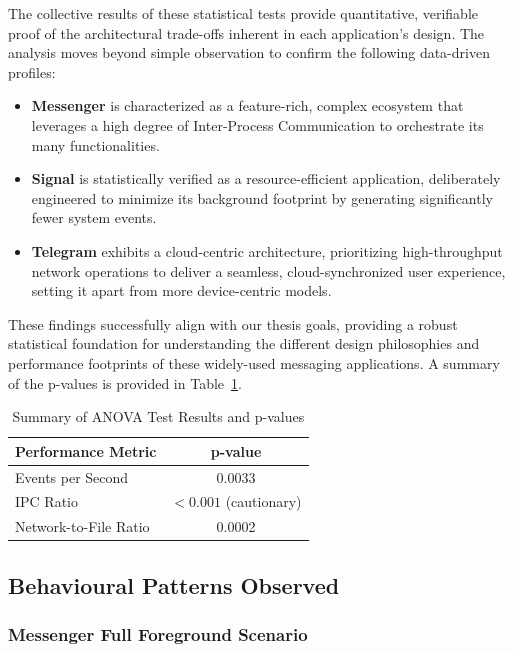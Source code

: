 \documentclass[a4paper,12pt]{report}
\begin{document}
The collective results of these statistical tests provide quantitative, verifiable proof of the architectural trade-offs inherent in each application's design. The analysis moves beyond simple observation to confirm the following data-driven profiles:
\begin{itemize}
    \item \textbf{Messenger} is characterized as a feature-rich, complex ecosystem that leverages a high degree of Inter-Process Communication to orchestrate its many functionalities.
    \item \textbf{Signal} is statistically verified as a resource-efficient application, deliberately engineered to minimize its background footprint by generating significantly fewer system events.
    \item \textbf{Telegram} exhibits a cloud-centric architecture, prioritizing high-throughput network operations to deliver a seamless, cloud-synchronized user experience, setting it apart from more device-centric models.
\end{itemize}
These findings successfully align with our thesis goals, providing a robust statistical foundation for understanding the different design philosophies and performance footprints of these widely-used messaging applications. A summary of the p-values is provided in Table~\ref{tab:comparative_tests_en}.

\begin{table}[H]
\centering
\caption{Summary of ANOVA Test Results and p-values}
\label{tab:comparative_tests_en}
\begin{tabular}{lc}
\toprule
\textbf{Performance Metric} & \textbf{p-value} \\
\midrule
Events per Second & 0.0033 \\
IPC Ratio & $< 0.001$ (cautionary) \\
Network-to-File Ratio & 0.0002 \\
\bottomrule
\end{tabular}
\end{table}


\subsection{Behavioural Patterns Observed}

\subsubsection{Messenger Full Foreground Scenario}
\end{document}
